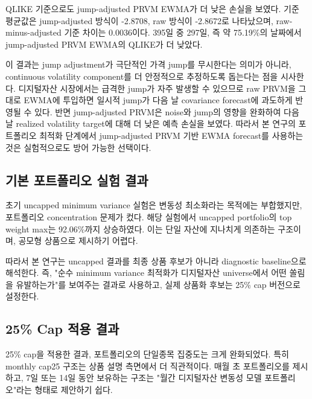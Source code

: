 \documentclass[12pt,a4paper]{article}
\begin{document}
QLIKE 기준으로도 jump-adjusted PRVM EWMA가 더 낮은 손실을 보였다. \texttt{} 기준 평균값은 jump-adjusted 방식이 -2.8708, raw 방식이 -2.8672로 나타났으며, raw-minus-adjusted 기준 차이는 0.0036이다. 395일 중 297일, 즉 약 75.19\%의 날짜에서 jump-adjusted PRVM EWMA의 QLIKE가 더 낮았다.

이 결과는 jump adjustment가 극단적인 가격 jump를 무시한다는 의미가 아니라, continuous volatility component를 더 안정적으로 추정하도록 돕는다는 점을 시사한다. 디지털자산 시장에서는 급격한 jump가 자주 발생할 수 있으므로 raw PRVM을 그대로 EWMA에 투입하면 일시적 jump가 다음 날 covariance forecast에 과도하게 반영될 수 있다. 반면 jump-adjusted PRVM은 noise와 jump의 영향을 완화하여 다음 날 realized volatility target에 대해 더 낮은 예측 손실을 보였다. 따라서 본 연구의 포트폴리오 최적화 단계에서 jump-adjusted PRVM 기반 EWMA forecast를 사용하는 것은 실험적으로도 방어 가능한 선택이다.


\subsection{기본 포트폴리오 실험 결과}

초기 uncapped minimum variance 실험은 변동성 최소화라는 목적에는 부합했지만, 포트폴리오 concentration 문제가 컸다. 해당 실험에서 uncapped portfolio의 top weight max는 92.06\%까지 상승하였다. 이는 단일 자산에 지나치게 의존하는 구조이며, 공모형 상품으로 제시하기 어렵다.

따라서 본 연구는 uncapped 결과를 최종 상품 후보가 아니라 diagnostic baseline으로 해석한다. 즉, "순수 minimum variance 최적화가 디지털자산 universe에서 어떤 쏠림을 유발하는가"를 보여주는 결과로 사용하고, 실제 상품화 후보는 25\% cap 버전으로 설정한다.


\subsection{25\% Cap 적용 결과}

25\% cap을 적용한 결과, 포트폴리오의 단일종목 집중도는 크게 완화되었다. 특히 monthly cap25 구조는 상품 설명 측면에서 더 직관적이다. 매월 초 포트폴리오를 제시하고, 7일 또는 14일 동안 보유하는 구조는 "월간 디지털자산 변동성 모델 포트폴리오"라는 형태로 제안하기 쉽다.
\end{document}
